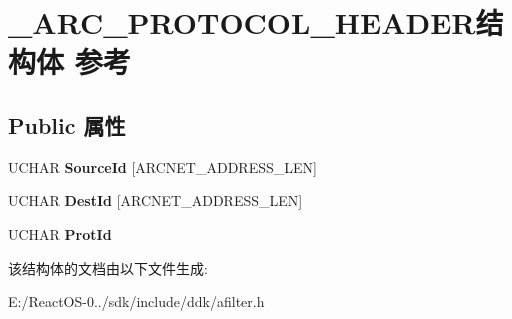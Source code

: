 \hypertarget{struct___a_r_c___p_r_o_t_o_c_o_l___h_e_a_d_e_r}{}\section{\+\_\+\+A\+R\+C\+\_\+\+P\+R\+O\+T\+O\+C\+O\+L\+\_\+\+H\+E\+A\+D\+E\+R结构体 参考}
\label{struct___a_r_c___p_r_o_t_o_c_o_l___h_e_a_d_e_r}
\subsection*{Public 属性}
\begin{DoxyCompactItemize}
\item 
\mbox{\label{struct___a_r_c___p_r_o_t_o_c_o_l___h_e_a_d_e_r_aa3de3fdaab3db4d96387bc1c3ffbd33a}} 
U\+C\+H\+AR {\bfseries Source\+Id} \mbox{[}A\+R\+C\+N\+E\+T\+\_\+\+A\+D\+D\+R\+E\+S\+S\+\_\+\+L\+EN\mbox{]}
\item 
\mbox{\label{struct___a_r_c___p_r_o_t_o_c_o_l___h_e_a_d_e_r_a67212baf09448c8d659046ac82a205fc}} 
U\+C\+H\+AR {\bfseries Dest\+Id} \mbox{[}A\+R\+C\+N\+E\+T\+\_\+\+A\+D\+D\+R\+E\+S\+S\+\_\+\+L\+EN\mbox{]}
\item 
\mbox{\label{struct___a_r_c___p_r_o_t_o_c_o_l___h_e_a_d_e_r_a2b5356bf4400e94cef34cb1428a2ce4b}} 
U\+C\+H\+AR {\bfseries Prot\+Id}
\end{DoxyCompactItemize}


该结构体的文档由以下文件生成\+:\begin{DoxyCompactItemize}
\item 
E\+:/\+React\+O\+S-\/0../sdk/include/ddk/afilter.\+h\end{DoxyCompactItemize}
